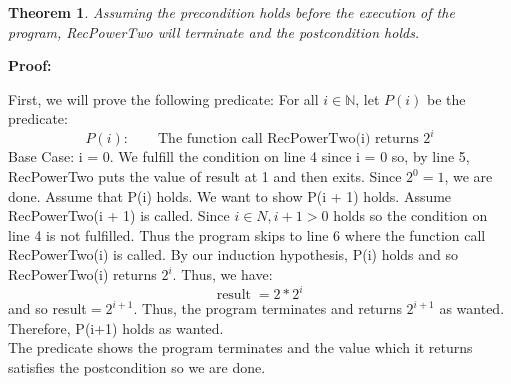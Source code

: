 \documentclass{article}
\newtheorem{theorem}{Theorem}
\begin{document}


\begin{theorem}
    Assuming the precondition holds before the execution of the program, RecPowerTwo
    will terminate and the postcondition holds.
\end{theorem}

\textbf{Proof:}

First, we will prove the following predicate: For all $i\in\mathbb{N}$, let $P(i)$ be the predicate:
\[ P(i):\qquad\text{The function call RecPowerTwo(i) returns $2^i$} \]
Base Case: i = 0. We fulfill the condition on line 4 since i = 0 so, by line 5, RecPowerTwo puts
the value of result at 1 and then exits. Since $2^0 = 1$, we are done.
Assume that P(i) holds. We want to show P(i + 1) holds.
Assume RecPowerTwo(i + 1) is called. Since $i \in N, i + 1 > 0$ holds so the condition on line 4 is
not fulfilled. Thus the program skips to line 6 where the function call RecPowerTwo(i) is called.
By our induction hypothesis, P(i) holds and so RecPowerTwo(i) returns $2^i$. Thus, we have:
\[ \text{result}\; = 2 * 2^i \]
and so result$ = 2^{i+1}$. Thus, the program terminates and returns $2^{i+1}$ as wanted. Therefore,
P(i+1) holds as wanted.\\

The predicate shows the program terminates and the value which it returns satisfies the postcondition
so we are done.
\end{document}
